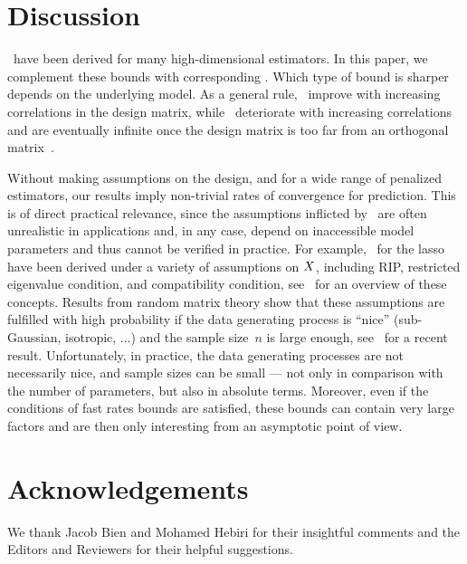 \documentclass[bj]{imsart}
\newcommand{\1}{{\rm 1}\mskip -4,5mu{\rm l} }
\begin{document}
\section{Discussion}\label{sec:discussion}
\Sbos\ have been derived for many high-dimensional estimators. In this paper, we complement these bounds with corresponding \pbos. Which type of bound is sharper depends on the underlying model. As a general rule, \pbos\ improve with increasing correlations in the design matrix, while \sbos\ deteriorate with increasing correlations and are eventually infinite once the design matrix is too far from an orthogonal matrix~\cite{ArnakMoYo14}.

Without making assumptions on the design, and for a wide range of penalized estimators, our results imply non-trivial rates of convergence for prediction.  This is of direct practical relevance, since  the assumptions inflicted by \sbos\ are often unrealistic in applications and, in any case, depend on inaccessible model parameters and thus cannot be verified in practice. For example, \sbos\ for the lasso have been derived under a variety of assumptions  on $\textcolor{black}{X}$, including RIP, restricted eigenvalue condition, and compatibility condition, see~\cite{Sara09} for an overview of these concepts. Results from random matrix theory show that these assumptions are fulfilled with high probability if the data generating process is ``nice'' (sub-Gaussian, isotropic, ...) and the sample size~$n$ is large enough, see~\cite{Sara14} for a recent result. 
Unfortunately, in practice, the data generating processes are not necessarily nice, and sample sizes can be small --- not only in comparison with the number of parameters, but also in absolute terms. 
Moreover, even if the conditions of fast rates bounds are satisfied, these bounds can contain very large factors and are then only interesting from an asymptotic point of view.%

\section*{Acknowledgements} We thank Jacob Bien and Mohamed Hebiri for their insightful comments and the Editors and Reviewers for their helpful suggestions.
\end{document}
